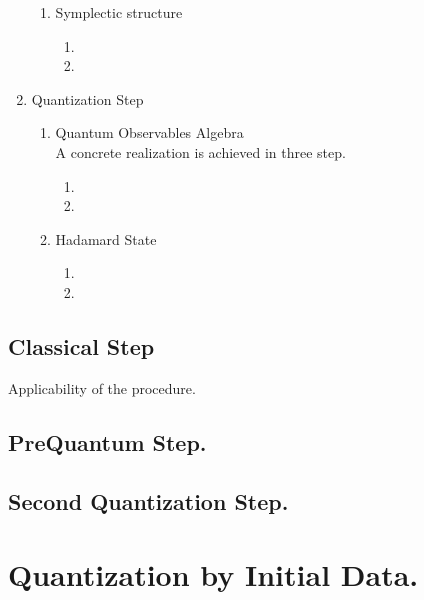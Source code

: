 \documentclass[Main]{subfiles}
\begin{document}
\begin{enumerate}
\begin{enumerate}
   				 \item Symplectic structure
   				   	\begin{enumerate}
   						\item
   						\item
   					\end{enumerate}
   			\end{enumerate}
  
   		\item Quantization Step
   		   	\begin{enumerate}
   				\item Quantum Observables Algebra\\
   					A concrete realization is achieved in three step.
   					\begin{enumerate}
   						\item
   						\item
   					\end{enumerate}
   					
   				\item Hadamard State
   				   	\begin{enumerate}
   						\item
   						\item
   					\end{enumerate}
   				 
   			\end{enumerate}
 \end{enumerate}


	\subsection{Classical Step}
	Applicability of the procedure.
	
	\subsection{PreQuantum Step.}
	
	\subsection{Second Quantization Step.}


\section{Quantization by Initial Data.}
\end{document}
